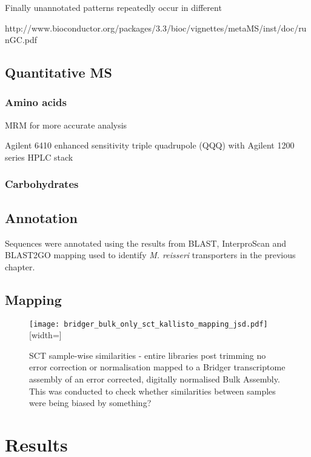 Finally unannotated patterns repeatedly occur in different 


http://www.bioconductor.org/packages/3.3/bioc/vignettes/metaMS/inst/doc/runGC.pdf





\subsection{Quantitative MS}

\subsubsection{Amino acids}

MRM for more accurate analysis 

Agilent 6410 enhanced sensitivity triple quadrupole (QQQ) 
with Agilent 1200 series HPLC stack

\subsubsection{Carbohydrates}


\subsection{Annotation}

Sequences were annotated using the results from BLAST, InterproScan
and BLAST2GO mapping used to identify \textit{M. reisseri} transporters
in the previous chapter. 



\subsection{Mapping}


\begin{figure}
	\texttt{[image: bridger\_bulk\_only\_sct\_kallisto\_mapping\_jsd.pdf]}[width=\textwidth]
	\caption{SCT sample-wise similarities - entire libraries post trimming
		no error correction or normalisation mapped to a Bridger transcriptome 
		assembly of an error corrected, digitally normalised Bulk Assembly.  
		This was conducted to check whether similarities between samples
		were being biased by something?}
	\label{fig:bridger_bulk_heatmap}
\end{figure}


\section{Results}


